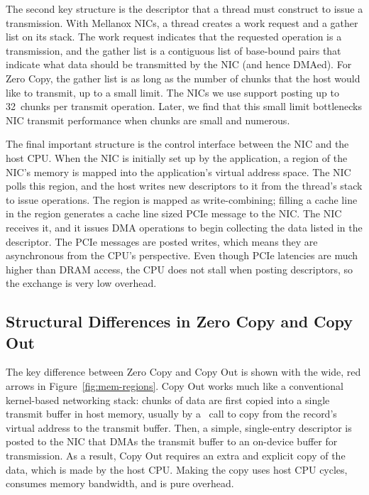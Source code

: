 The second key structure is the descriptor that a thread must construct to
issue a transmission. With Mellanox NICs, a thread creates a work request and a
gather list on its stack. The work request indicates that the requested
operation is a transmission, and the gather list is a contiguous list of
base-bound pairs that indicate what data should be transmitted by the NIC (and
hence DMAed). For Zero Copy, the gather list is as long as the number of chunks
that the host would like to transmit, up to a small limit. The NICs we use support
posting up to 32~chunks per transmit operation. Later, we find that this small
limit bottlenecks NIC transmit performance when chunks are small and numerous.

The final important structure is the control interface between the NIC and the
host CPU.  When the NIC is initially set up by the application, a region of the
NIC's memory is mapped into the application's virtual address space. The NIC
polls this region, and the host writes new descriptors to it from the thread's
stack to issue operations. The region is mapped as write-combining; filling a
cache line in the region generates a cache line sized PCIe message to the NIC.
The NIC receives it, and it issues DMA operations to begin collecting the data
listed in the descriptor. The PCIe messages are posted writes, which means they
are asynchronous from the CPU's perspective. Even though PCIe latencies are much
higher than DRAM access, the CPU does not stall when posting descriptors, so the
exchange is very low overhead.
\subsection{Structural Differences in Zero Copy and Copy Out}
The key difference between Zero Copy and Copy Out is shown with the wide, red
arrows in Figure~\ref{fig:mem-regions}. Copy Out works much like a conventional
kernel-based networking stack: chunks of data are first copied into a single
transmit buffer in host memory, usually by a \memcpy ~call to copy from the record's 
virtual address to the transmit buffer. Then, a simple, single-entry descriptor is
posted to the NIC that DMAs the transmit buffer to an on-device buffer for transmission.
As a result, Copy Out requires an extra and explicit copy of the data, which is made
by the host CPU.  Making the copy uses host CPU cycles, consumes memory
bandwidth, and is pure overhead. 



